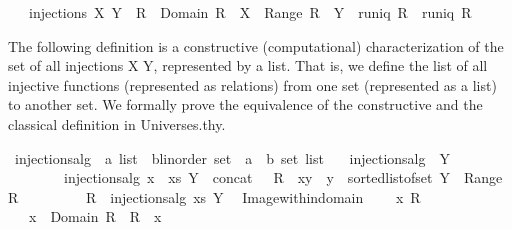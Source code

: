 \begin{isabellebody}
\ \ \ {\isachardoublequoteopen}injections\ X\ Y\ {\isacharequal}\ {\isacharbraceleft}R\ {\isachardot}\ Domain\ R\ {\isacharequal}\ X\ {\isasymand}\ Range\ R\ {\isasymsubseteq}\ Y\ {\isasymand}\ runiq\ R\ {\isasymand}\ runiq\ {\isacharparenleft}R{\isasyminverse}{\isacharparenright}{\isacharbraceright}{\isachardoublequoteclose}%
\begin{isamarkuptext}%
The following definition is a constructive (computational) characterization of the set of all injections X Y, represented by a list. That is, we define the list of all injective functions (represented as relations) from one set (represented as a list) to another set. We formally prove the equivalence of the constructive and the classical definition in Universes.thy.%
\end{isamarkuptext}%
\isamarkuptrue%
\isamarkupfalse%
\ injections{\isacharunderscore}alg\ {\isacharcolon}{\isacharcolon}\ {\isachardoublequoteopen}{\isacharprime}a\ list\ {\isasymRightarrow}\ {\isacharprime}b{\isasymColon}linorder\ set\ {\isasymRightarrow}\ {\isacharparenleft}{\isacharprime}a\ {\isasymtimes}\ {\isacharprime}b{\isacharparenright}\ set\ list{\isachardoublequoteclose}\isanewline
\ \ \ {\isachardoublequoteopen}injections{\isacharunderscore}alg\ {\isacharbrackleft}{\isacharbrackright}\ Y\ {\isacharequal}\ {\isacharbrackleft}{\isacharbraceleft}{\isacharbraceright}{\isacharbrackright}{\isachardoublequoteclose}\ {\isacharbar}\isanewline
\ \ \ \ \ \ \ \ {\isachardoublequoteopen}injections{\isacharunderscore}alg\ {\isacharparenleft}x\ {\isacharhash}\ xs{\isacharparenright}\ Y\ {\isacharequal}\ concat\ {\isacharbrackleft}\ {\isacharbrackleft}\ R\ {\isacharplus}{\isacharasterisk}\ {\isacharbraceleft}{\isacharparenleft}x{\isacharcomma}y{\isacharparenright}{\isacharbraceright}\ {\isachardot}\ y\ {\isasymleftarrow}\ sorted{\isacharunderscore}list{\isacharunderscore}of{\isacharunderscore}set\ {\isacharparenleft}Y\ {\isacharminus}\ Range\ R{\isacharparenright}\ {\isacharbrackright}\isanewline
\ \ \ \ \ \ \ {\isachardot}\ R\ {\isasymleftarrow}\ injections{\isacharunderscore}alg\ xs\ Y\ {\isacharbrackright}{\isachardoublequoteclose}\isanewline
\isanewline
\isanewline
\isanewline
\isanewline
{}\isamarkupfalse%
\ Image{\isacharunderscore}within{\isacharunderscore}domain{\isacharprime}{\isacharcolon}\ \isanewline
\ \ \ x\ R\ \isanewline
\ \ \ {\isachardoublequoteopen}{\isacharparenleft}x\ {\isasymin}\ Domain\ R{\isacharparenright}\ {\isacharequal}\ {\isacharparenleft}R\ {\isacharbackquote}{\isacharbackquote}\ {\isacharbraceleft}x{\isacharbraceright}\ {\isasymnoteq}\ {\isacharbraceleft}{\isacharbraceright}{\isacharparenright}{\isachardoublequoteclose}\ \isanewline

\end{isabellebody}
